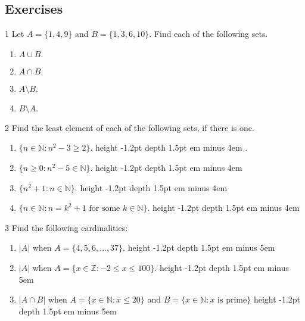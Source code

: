 \documentclass[11pt,]{book}
\newcommand{\fillin}[1]{\leavevmode\leaders\vrule height -1.2pt depth 1.5pt \hskip #1em minus #1em \null}
\theoremstyle{ptxplainnotitle}
\theoremstyle{ptxplaintitle}
\theoremstyle{ptxdefinitionnotitle}
\theoremstyle{ptxdefinitiontitle}
\theoremstyle{ptxdefinitionnotitle}
\theoremstyle{ptxdefinitiontitle}
\theoremstyle{ptxdefinitionnotitle}
\theoremstyle{ptxdefinitiontitle}
\theoremstyle{ptxdefinitiontitlenonumber}
\theoremstyle{ptxdefinitiontitlenonumber}
\numberwithin{equation}{chapter}
\newcommand{\N}{\mathbb N}
\newcommand{\Z}{\mathbb Z}
\newcommand{\st}{:}
\begin{document}
\subsection*{Exercises}\hypertarget{exercises_intro-sets}{}
\begin{divisionexercise}{1}\hypertarget{exercise-78}{}
\hypertarget{p-813}{}%
Let \(A = \{1, 4, 9\}\) and \(B = \{1, 3, 6, 10\}\text{.}\)  Find each of the following sets. \leavevmode%
\begin{enumerate}[label=\alph*.]
\item\hypertarget{li-345}{}\hypertarget{p-814}{}%
\(A \cup B\text{.}\)%
\item\hypertarget{li-346}{}\hypertarget{p-816}{}%
\(A \cap B\text{.}\)%
\item\hypertarget{li-347}{}\hypertarget{p-818}{}%
\(A \setminus B\text{.}\)%
\item\hypertarget{li-348}{}\hypertarget{p-820}{}%
\(B \setminus A\text{.}\)%
\end{enumerate}
%
\end{divisionexercise}%
\begin{divisionexercise}{2}\hypertarget{exercise-79}{}
\hypertarget{p-838}{}%
Find the least element of each of the following sets, if there is one. \leavevmode%
\begin{enumerate}[label=\alph*.]
\item\hypertarget{li-361}{}\hypertarget{p-839}{}%
\(\{n \in \N \st n^2 - 3 \ge 2\}\text{.}\)   \fillin{4}.%
\item\hypertarget{li-362}{}\hypertarget{p-840}{}%
\(\{n \ge 0 \st n^2 - 5 \in \N\}\text{.}\)   \fillin{4}%
\item\hypertarget{li-363}{}\hypertarget{p-841}{}%
\(\{n^2+1 \st n \in \N\}\text{.}\)  \fillin{4}%
\item\hypertarget{li-364}{}\hypertarget{p-842}{}%
\(\{n \in \N \st n = k^2 + 1 \text{ for some } k \in \N\}\text{.}\)  \fillin{4}%
\end{enumerate}
%
\end{divisionexercise}%
\begin{divisionexercise}{3}\hypertarget{exercise-80}{}
\hypertarget{p-857}{}%
Find the following cardinalities: \leavevmode%
\begin{enumerate}[label=\alph*.]
\item\hypertarget{li-375}{}\hypertarget{p-858}{}%
\(|A|\) when \(A = \{4,5,6,\ldots,37\}\text{.}\)   \fillin{5}%
\item\hypertarget{li-376}{}\hypertarget{p-859}{}%
\(|A|\) when \(A = \{x \in \Z \st -2 \le x \le 100\}\text{.}\)   \fillin{5}%
\item\hypertarget{li-377}{}\hypertarget{p-860}{}%
\(|A \cap B|\) when \(A = \{x \in \N \st x \le 20\}\) and \(B = \{x \in \N \st x \mbox{ is prime} \}\)  \fillin{5}%
\end{enumerate}
%
\end{divisionexercise}%
\end{document}
